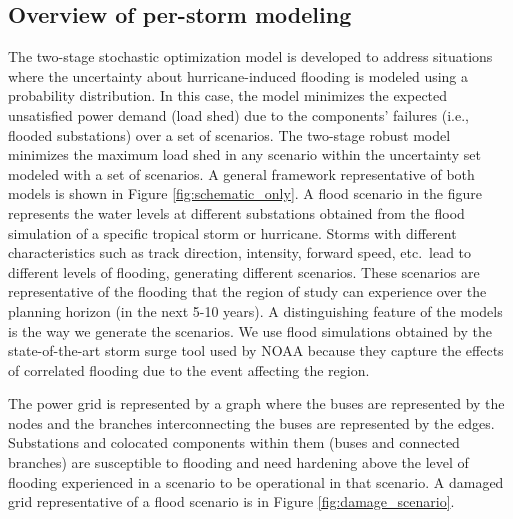 \documentclass[authoryear,preprint,review,12pt]{elsarticle}\usepackage{amssymb}
\begin{document}

\subsection{Overview of per-storm modeling}

The two-stage stochastic optimization model is developed to address situations where the uncertainty about hurricane-induced flooding is modeled using a probability distribution. In this case, the model minimizes the expected unsatisfied power demand (load shed) due to the components' failures (i.e., flooded substations) over a set of scenarios. The two-stage robust model minimizes the maximum load shed in any scenario within the uncertainty set modeled with a set of scenarios. A general framework representative of both models is shown in Figure \ref{fig:schematic_only}. A flood scenario in the figure represents the water levels at different substations obtained from the flood simulation of a specific tropical storm or hurricane. Storms with different characteristics such as track direction, intensity, forward speed, etc.\ lead to different levels of flooding, generating different scenarios. These scenarios are representative of the flooding that the region of study can experience over the planning horizon (in the next 5-10 years). A distinguishing feature of the models is the way we generate the scenarios. We use flood simulations obtained by the state-of-the-art storm surge tool used by NOAA because they capture the effects of correlated flooding due to the event affecting the region. 

The power grid is represented by a graph where the buses are represented by the nodes and the branches interconnecting the buses are represented by the edges. Substations and colocated components within them (buses and connected branches) are susceptible to flooding and need hardening above the level of flooding experienced in a scenario to be operational in that scenario. A damaged grid representative of a flood scenario is in Figure \ref{fig:damage_scenario}. 
\end{document}
